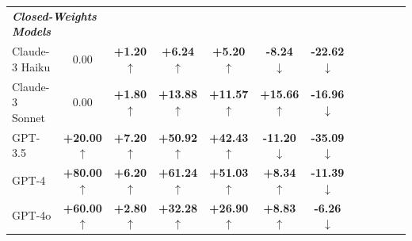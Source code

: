 \documentclass{article}
\newcommand{\gooddelta}[1]{\textcolor{mygreen}{\textbf{+#1} $\uparrow$}}
\newcommand{\baddelta}[1]{\textcolor{myred}{\textbf{#1} $\downarrow$}}
\newcommand{\gooddeltaNeg}[1]{\textcolor{mygreen}{\textbf{#1} $\downarrow$}}
\begin{document}
\begin{table}[h]
\begin{tabular}{lccccccccccc}
\midrule
\multicolumn{2}{l}{\textbf{\textit{Closed-Weights Models}}}  \\
Claude-3 Haiku & {0.00} & \gooddelta{1.20} & \gooddelta{6.24} & \gooddelta{5.20} & \baddelta{-8.24} & \gooddeltaNeg{-22.62} \\
Claude-3 Sonnet & {0.00} & \gooddelta{1.80} & \gooddelta{13.88} & \gooddelta{11.57} & \gooddelta{15.66} & \gooddeltaNeg{-16.96} \\
GPT-3.5 & \gooddelta{20.00} & \gooddelta{7.20} & \gooddelta{50.92} & \gooddelta{42.43} & \baddelta{-11.20} & \gooddeltaNeg{-35.09} \\
GPT-4 & \gooddelta{80.00} & \gooddelta{6.20} & \gooddelta{61.24} & \gooddelta{51.03} & \gooddelta{8.34} & \gooddeltaNeg{-11.39} \\
GPT-4o & \gooddelta{60.00} & \gooddelta{2.80} & \gooddelta{32.28} & \gooddelta{26.90} & \gooddelta{8.83} & \gooddeltaNeg{-6.26} \\
\midrule
\end{tabular}
\end{table}
\end{document}
